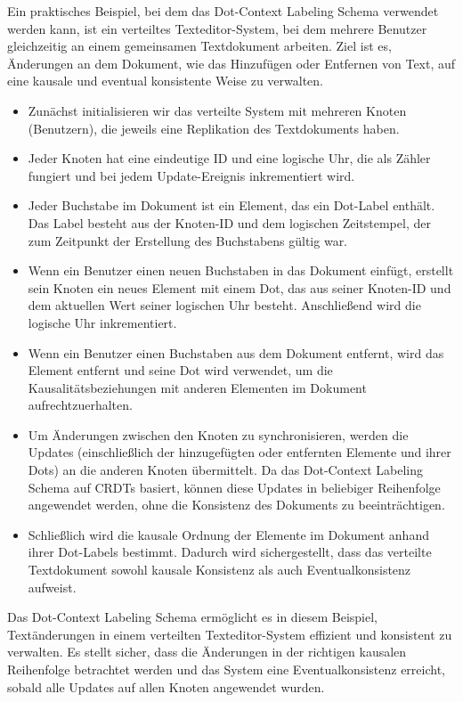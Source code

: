 Ein praktisches Beispiel, bei dem das Dot-Context Labeling Schema verwendet werden kann, ist ein verteiltes Texteditor-System, bei dem mehrere Benutzer gleichzeitig an einem gemeinsamen Textdokument arbeiten. Ziel ist es, Änderungen an dem Dokument, wie das Hinzufügen oder Entfernen von Text, auf eine kausale und eventual konsistente Weise zu verwalten.
\begin{itemize}
\item Zunächst initialisieren wir das verteilte System mit mehreren Knoten (Benutzern), die jeweils eine Replikation des Textdokuments haben.
\item Jeder Knoten hat eine eindeutige ID und eine logische Uhr, die als Zähler fungiert und bei jedem Update-Ereignis inkrementiert wird.
\item Jeder Buchstabe im Dokument ist ein Element, das ein Dot-Label enthält. Das Label besteht aus der Knoten-ID und dem logischen Zeitstempel, der zum Zeitpunkt der Erstellung des Buchstabens gültig war.
\item Wenn ein Benutzer einen neuen Buchstaben in das Dokument einfügt, erstellt sein Knoten ein neues Element mit einem Dot, das aus seiner Knoten-ID und dem aktuellen Wert seiner logischen Uhr besteht. Anschließend wird die logische Uhr inkrementiert.
\item Wenn ein Benutzer einen Buchstaben aus dem Dokument entfernt, wird das Element entfernt und seine Dot wird verwendet, um die Kausalitätsbeziehungen mit anderen Elementen im Dokument aufrechtzuerhalten.
\item Um Änderungen zwischen den Knoten zu synchronisieren, werden die Updates (einschließlich der hinzugefügten oder entfernten Elemente und ihrer Dots) an die anderen Knoten übermittelt. Da das Dot-Context Labeling Schema auf CRDTs basiert, können diese Updates in beliebiger Reihenfolge angewendet werden, ohne die Konsistenz des Dokuments zu beeinträchtigen.
\item Schließlich wird die kausale Ordnung der Elemente im Dokument anhand ihrer Dot-Labels bestimmt. Dadurch wird sichergestellt, dass das verteilte Textdokument sowohl kausale Konsistenz als auch Eventualkonsistenz aufweist.
\end{itemize}
Das Dot-Context Labeling Schema ermöglicht es in diesem Beispiel, Textänderungen in einem verteilten Texteditor-System effizient und konsistent zu verwalten. Es stellt sicher, dass die Änderungen in der richtigen kausalen Reihenfolge betrachtet werden und das System eine Eventualkonsistenz erreicht, sobald alle Updates auf allen Knoten angewendet wurden.

